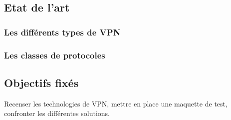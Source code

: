 \subsection{Etat de l'art}
\subsubsection{Les différents types de VPN}
\subsubsection{Les classes de protocoles}


\subsection{Objectifs fixés}
Recenser les technologies de VPN, mettre en place une maquette de test, confronter les différentes solutions.

\pagebreak
